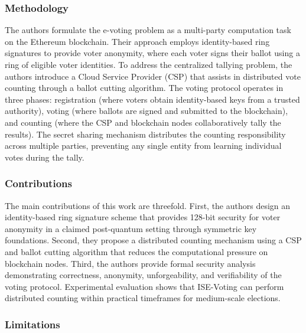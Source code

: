 \subsubsection{Methodology}
\label{subsubsec:ise-method}

The authors formulate the e-voting problem as a multi-party computation task on the Ethereum blockchain. Their approach employs identity-based ring signatures to provide voter anonymity, where each voter signs their ballot using a ring of eligible voter identities. To address the centralized tallying problem, the authors introduce a Cloud Service Provider (CSP) that assists in distributed vote counting through a ballot cutting algorithm. The voting protocol operates in three phases: registration (where voters obtain identity-based keys from a trusted authority), voting (where ballots are signed and submitted to the blockchain), and counting (where the CSP and blockchain nodes collaboratively tally the results). The secret sharing mechanism distributes the counting responsibility across multiple parties, preventing any single entity from learning individual votes during the tally.

\subsubsection{Contributions}
\label{subsubsec:ise-contrib}

The main contributions of this work are threefold. First, the authors design an identity-based ring signature scheme that provides 128-bit security for voter anonymity in a claimed post-quantum setting through symmetric key foundations. Second, they propose a distributed counting mechanism using a CSP and ballot cutting algorithm that reduces the computational pressure on blockchain nodes. Third, the authors provide formal security analysis demonstrating correctness, anonymity, unforgeability, and verifiability of the voting protocol. Experimental evaluation shows that ISE-Voting can perform distributed counting within practical timeframes for medium-scale elections.

\subsubsection{Limitations}
\label{subsubsec:ise-limits}


